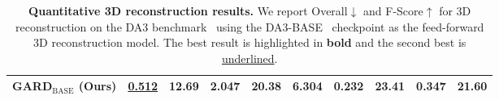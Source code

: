 \documentclass{llmxive}
\begin{document}
\begin{table}[h]
{\begin{tabular}{lccccccccc}
\textbf{GARD$_\text{BASE}$ (Ours)}
&  \underline{0.512}    &    \textbf{12.69}
&  \textbf{2.047}   &     \textbf{20.38}  
&  \textbf{6.304}
&  \textbf{0.232}     &     \textbf{23.41}
&  \textbf{0.347}     &     \textbf{21.60}  
\\


\bottomrule
\end{tabular}
}

\caption{\textbf{Quantitative 3D reconstruction results.} We report Overall$\downarrow$ and F-Score$\uparrow$ for 3D reconstruction on the DA3 benchmark~\cite{depthanything3} using the DA3-BASE~\cite{depthanything3} checkpoint as the feed-forward 3D reconstruction model. The best result is highlighted in \textbf{bold} and the second best is \underline{underlined}.}
\label{supple_tab:da3_base_recon}
\end{table}
\end{document}
